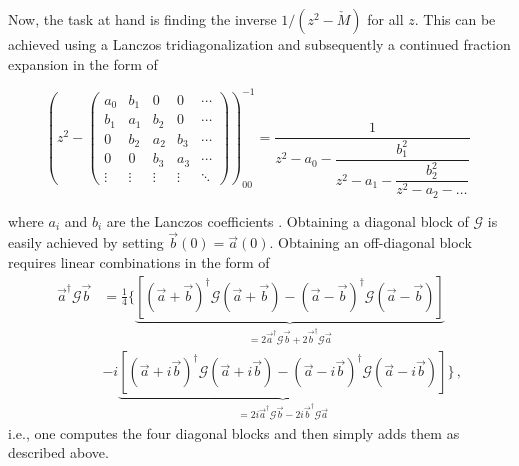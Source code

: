 \documentclass[
    reprint, 
    aps,
    preprintnumbers,
    twocolumn,
    prb,
    superscriptaddress
]{revtex4-2}
\begin{document}
Now, the task at hand is finding the inverse $1/(z^2 - \check{M})$ for all $z$.
This can be achieved using a Lanczos tridiagonalization and subsequently a continued fraction expansion in the form of

\begin{widetext}
\begin{equation}
    \left( z^2 - \begin{pmatrix}
        a_0 & b_1 & 0 & 0 & \cdots \\
        b_1 & a_1 & b_2 & 0 & \cdots \\
        0 & b_2 & a_2 & b_3 & \cdots \\
        0 & 0 & b_3 & a_3 & \cdots \\
        \vdots & \vdots & \vdots & \vdots & \ddots
    \end{pmatrix} \right)_{00}^{-1} = \dfrac{1}{z^2 - a_0 - \dfrac{b_1^2}{z^2 - a_1 - \dfrac{b_2^2}{ z^2 - a_2 - \hdots}}}\,\,
\end{equation}
\end{widetext}

where $a_i$ and $b_i$ are the Lanczos coefficients \cite{PettiforRecursion,ViswanathRecursion}.
Obtaining a diagonal block of $\mathcal{G}$ is easily achieved by setting $\vec{b}(0) = \vec{a}(0)$.
Obtaining an off-diagonal block requires linear combinations in the form of 
\begin{align}
    \vec{a}^\dagger \mathcal{G} \vec{b} &= \frac{1}{4} \Big\{ 
        \underbrace{\left[ (\vec{a} + \vec{b})^\dagger \mathcal{G} (\vec{a} + \vec{b}) - (\vec{a} - \vec{b})^\dagger \mathcal{G} (\vec{a} - \vec{b}) \right]}_{ = 2 \vec{a}^\dagger \mathcal{G} \vec{b} + 2 \vec{b}^\dagger \mathcal{G} \vec{a}} \\
    &-i \underbrace{\left[ (\vec{a} + i \vec{b})^\dagger \mathcal{G} (\vec{a} + i \vec{b}) - (\vec{a} - i \vec{b})^\dagger \mathcal{G} (\vec{a} - i \vec{b}) \right]}_{= 2i \vec{a}^\dagger \mathcal{G} \vec{b} - 2i \vec{b}^\dagger \mathcal{G} \vec{a}} \Big\}\,, \nonumber
\end{align}
i.e., one computes the four diagonal blocks and then simply adds them as described above.
\end{document}
